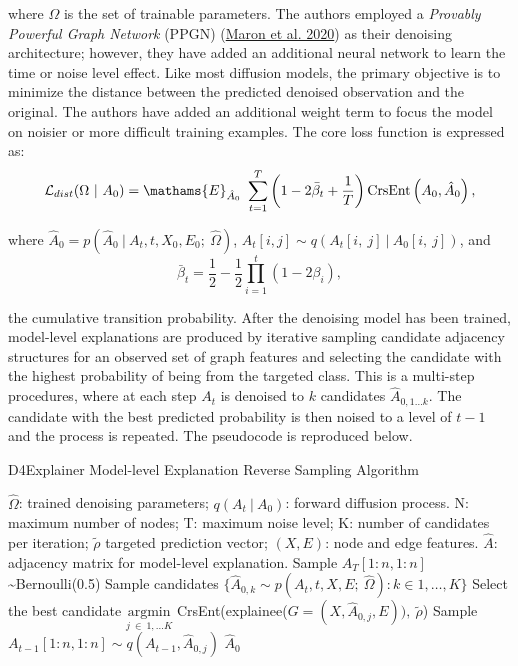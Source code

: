 \documentclass[
  11pt,
  letterpaper,
]{article}
\begin{document}
where \(\Omega\) is the set of trainable parameters. The authors
employed a \emph{Provably Powerful Graph Network} (PPGN)
(\protect\hyperlink{ref-Maron_Ben-Hamu_Serviansky_Lipman_2020}{Maron et
al. 2020}) as their denoising architecture; however, they have added an
additional neural network to learn the time or noise level effect. Like
most diffusion models, the primary objective is to minimize the distance
between the predicted denoised observation and the original. The authors
have added an additional weight term to focus the model on noisier or
more difficult training examples. The core loss function is expressed
as: \begin{equation} \label{L-dist}
    \mathcal{L}_{dist} (\Omega \ | \ A_0) = \mathams{E}_{\hat A_0} \ \sum_{t=1}^T \left(1 - 2 \bar \beta_t + \dfrac 1 T \right) \text{CrsEnt} \left(A_0, \hat A_0 \right), 
\end{equation}

where \(\hat A_0 = p(\hat A_0 \ | \ A_t, t, X_0, E_0; \ \hat \Omega)\),
\(A_t[i, j] \sim q(A_t[i, \ j] \ | \ A_{0}[i, \ j])\), and \[
    \bar \beta_t = \frac 1 2 - \frac 1 2 \prod^t_{i=1}(1-2\beta_i), 
\]

the cumulative transition probability. After the denoising model has
been trained, model-level explanations are produced by iterative
sampling candidate adjacency structures for an observed set of graph
features and selecting the candidate with the highest probability of
being from the targeted class. This is a multi-step procedures, where at
each step \(A_t\) is denoised to \(k\) candidates
\(\hat A_{0, 1 \dots k}\). The candidate with the best predicted
probability is then noised to a level of \(t-1\) and the process is
repeated. The pseudocode is reproduced below.

\begin{algorithm}
\caption{D4Explainer Model-level Explanation Reverse Sampling Algorithm}\label{alg:cap}
\begin{algorithmic}
    \Require $\hat \Omega$: trained denoising parameters; 
            $q(A_t \ | \ A_0)$: forward diffusion process.
    \renewcommand{\algorithmicrequire}{\textbf{Input:}}
    \renewcommand{\algorithmicensure}{\textbf{Output:}}
    \Require N: maximum number of nodes; T: maximum noise level; 
            K: number of candidates per iteration; 
            $\tilde{\rho}$ targeted prediction vector; 
            $(X, E)$: node and edge features.  
    \Ensure $\hat A$: adjacency matrix for model-level explanation.
    \State Sample $A_T[1:n, 1:n]$ \sim Bernoulli(0.5)
        \State Sample candidates 
            $\{\hat A_{0, k} \sim p(A_t,t, X, E; \ \hat \Omega) : k \in 1, \dots, K\}$
        \State Select the best candidate 
        $\underset{j \ \in \ 1, \dots K}{\text{argmin}}$ 
        CrsEnt(explainee($G = (X, \hat A_{0, j}, E)), \ \tilde{\rho}$)
        \State Sample $A_{t-1}[1:n, 1:n] \sim q(A_{t-1}, \hat A_{0, j})$
    \EndFor
    \State \Return $\hat A_0$
\end{algorithmic}
\end{algorithm}
\end{document}
